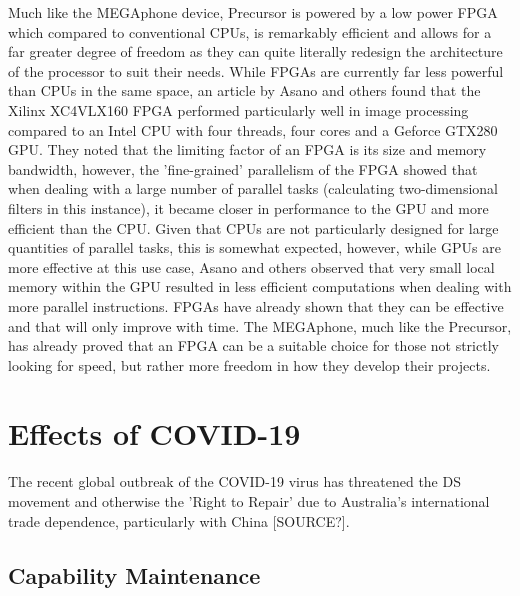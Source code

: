 Much like the MEGAphone device, Precursor is powered by a low power FPGA which compared to conventional CPUs, is remarkably efficient and allows for a far greater degree of freedom as they can quite literally redesign the architecture of the processor to suit their needs.
While FPGAs are currently far less powerful than CPUs in the same space, an article by Asano and others \cite{fpga} found that the Xilinx XC4VLX160 FPGA performed particularly well in image processing compared to an Intel CPU with four threads, four cores and a Geforce GTX280 GPU.
They noted that the limiting factor of an FPGA is its size and memory bandwidth, however, the 'fine-grained' parallelism of the FPGA showed that when dealing with a large number of parallel tasks (calculating two-dimensional filters in this instance), it became closer in performance to the GPU and more efficient than the CPU.
Given that CPUs are not particularly designed for large quantities of parallel tasks, this is somewhat expected, however, while GPUs are more effective at this use case, Asano and others observed that very small local memory within the GPU resulted in less efficient computations when dealing with more parallel instructions.
FPGAs have already shown that they can be effective and that will only improve with time.
The MEGAphone, much like the Precursor, has already proved that an FPGA can be a suitable choice for those not strictly looking for speed, but rather more freedom in how they develop their projects.


\section{Effects of COVID-19} %
The recent global outbreak of the COVID-19 virus has threatened the DS movement and otherwise the 'Right to Repair' due to Australia's international trade dependence, particularly with China [SOURCE?].

\subsection{Capability Maintenance}

